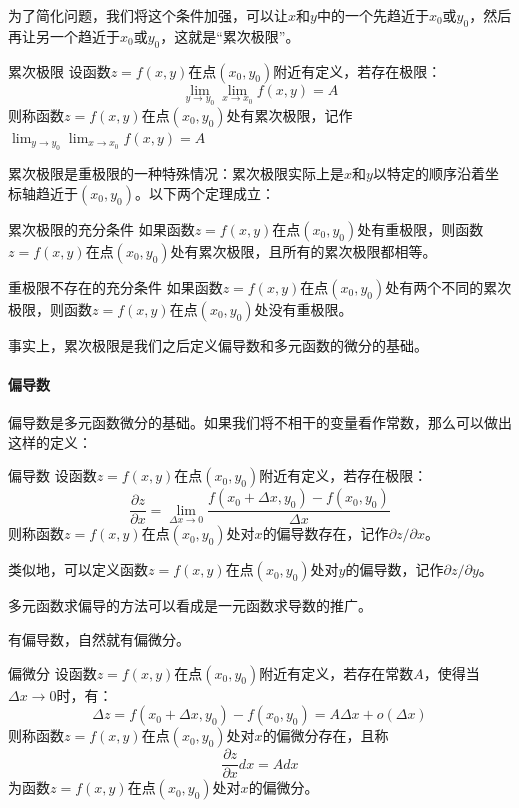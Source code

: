 为了简化问题，我们将这个条件加强，可以让$x$和$y$中的一个先趋近于$x_0$或$y_0$，然后再让另一个趋近于$x_0$或$y_0$，这就是“累次极限”。
\begin{definition}{累次极限}{}
设函数$z = f(x, y)$在点$(x_0, y_0)$附近有定义，若存在极限：
\begin{equation}
    \lim_{y \to y_0} \lim_{x \to x_0} f(x, y) = A
\end{equation}
则称函数$z = f(x, y)$在点$(x_0, y_0)$处有累次极限，记作$\lim_{y \to y_0} \lim_{x \to x_0} f(x, y) = A$
\end{definition}
累次极限是重极限的一种特殊情况：累次极限实际上是$x$和$y$以特定的顺序沿着坐标轴趋近于$(x_0, y_0)$。以下两个定理成立：
\begin{theorem}{累次极限的充分条件}{}
    如果函数$z = f(x, y)$在点$(x_0, y_0)$处有重极限，则函数$z = f(x, y)$在点$(x_0, y_0)$处有累次极限，且所有的累次极限都相等。
\end{theorem}
\begin{theorem}{重极限不存在的充分条件}{}
    如果函数$z = f(x, y)$在点$(x_0, y_0)$处有两个不同的累次极限，则函数$z = f(x, y)$在点$(x_0, y_0)$处没有重极限。
\end{theorem}
事实上，累次极限是我们之后定义偏导数和多元函数的微分的基础。

\paragraph{偏导数}

偏导数是多元函数微分的基础。如果我们将不相干的变量看作常数，那么可以做出这样的定义：

\begin{definition}{偏导数}{}
设函数$z = f(x, y)$在点$(x_0, y_0)$附近有定义，若存在极限：
\begin{equation}
    \frac{\partial z}{\partial x} = \lim_{\Delta x \to 0} \frac{f(x_0 + \Delta x, y_0) - f(x_0, y_0)}{\Delta x}
\end{equation}
则称函数$z = f(x, y)$在点$(x_0, y_0)$处对$x$的偏导数存在，记作$\partial z / \partial x$。
\end{definition}
类似地，可以定义函数$z = f(x, y)$在点$(x_0, y_0)$处对$y$的偏导数，记作$\partial z / \partial y$。

多元函数求偏导的方法可以看成是一元函数求导数的推广。

有偏导数，自然就有偏微分。

\begin{definition}{偏微分}{}
设函数$z = f(x, y)$在点$(x_0, y_0)$附近有定义，若存在常数$A$，使得当$\Delta x \to 0$时，有：
\begin{equation}
    \Delta z = f(x_0 + \Delta x, y_0) - f(x_0, y_0) = A \Delta x + o(\Delta x)
\end{equation}
则称函数$z = f(x, y)$在点$(x_0, y_0)$处对$x$的偏微分存在，且称
\begin{equation}
    \frac{\partial z}{\partial x} dx = A dx
\end{equation}
为函数$z = f(x, y)$在点$(x_0, y_0)$处对$x$的偏微分。
\end{definition}

